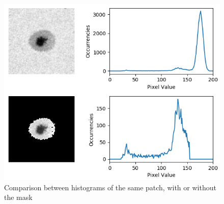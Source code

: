 \begin{figure}[hb!]
  \centering
  \captionsetup{justification=centering}
  \includegraphics[width=\textwidth]{./pictures/histograms}
  \caption{Comparison between histograms of the same patch, with or without the mask}
  \label{fig:histograms}
\end{figure}\\
